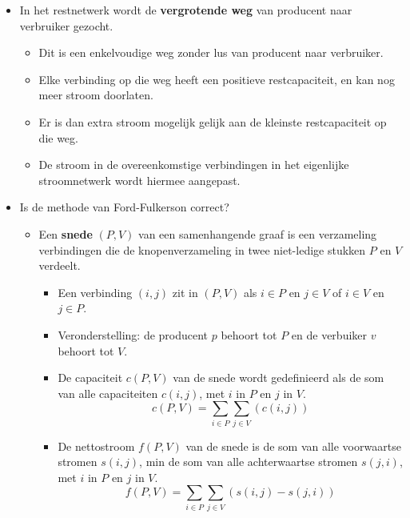 \begin{itemize}
\begin{itemize}
    \end{itemize}
    \item In het restnetwerk wordt de \textbf{vergrotende weg} van producent naar verbruiker gezocht.
    \begin{itemize}
        \item Dit is een enkelvoudige weg zonder lus van producent naar verbruiker.
        \item Elke verbinding op die weg heeft een positieve restcapaciteit, en kan nog meer stroom doorlaten.
        \item Er is dan extra stroom mogelijk gelijk aan de kleinste restcapaciteit op die weg.
        \item De stroom in de overeenkomstige verbindingen in het eigenlijke stroomnetwerk wordt hiermee aangepast.
    \end{itemize}

    \item Is de methode van Ford-Fulkerson correct?
    \begin{itemize}
        \item Een \textbf{snede} $(P, V)$ van een samenhangende graaf is een verzameling verbindingen die de knopenverzameling in twee niet-ledige stukken $P$ en $V$ verdeelt.
        \begin{itemize}
            \item Een verbinding $(i, j)$ zit in $(P, V)$ als $i \in P$ en $j \in V$ of $i \in V$ en $j \in P$. 
            \item Veronderstelling: de producent $p$ behoort tot $P$ en de verbuiker $v$ behoort tot $V$.
            \item De capaciteit $c(P, V)$ van de snede wordt gedefinieerd als de som van alle capaciteiten $c(i, j)$, met $i$ in $P$ en $j$ in $V$.
            $$c(P, V) = \sum_{i \in P}\sum_{j \in V} (c(i, j))$$
            \item De nettostroom $f(P, V)$ van de snede is de som van alle voorwaartse stromen $s(i, j)$, min de som van alle achterwaartse stromen $s(j, i)$, met $i$ in $P$ en $j$ in $V$.
            $$f(P, V) = \sum_{i \in P}\sum_{j \in V} (s(i, j) - s(j, i))$$
        \end{itemize}


\end{itemize}
\end{itemize}
